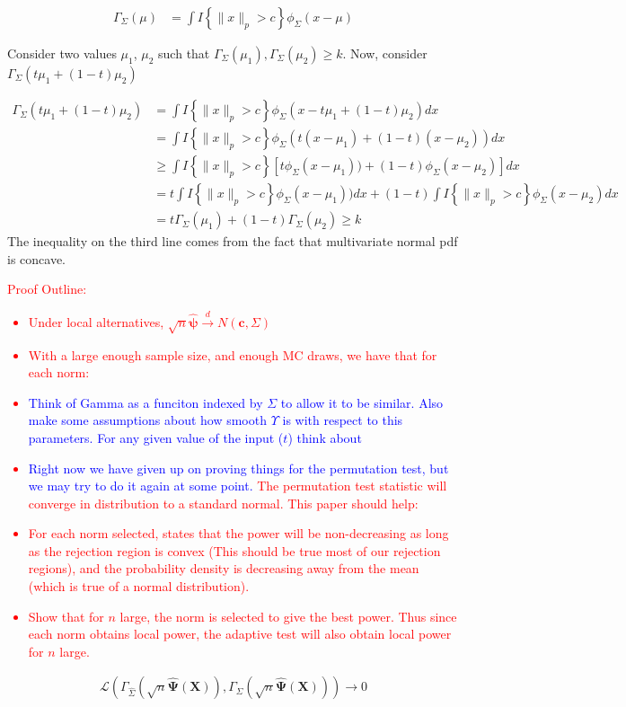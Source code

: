 \documentclass{article}
\newcommand{\sh}{\textcolor{red}}
\newcommand{\vmat}{\Sigma}
\newcommand{\Gammaf}{\Gamma_{\Sigma}}
\newcommand{\gi}{\Upsilon}
\begin{document}
\begin{align*}
	\Gammaf(\mu) & = \int I\left\{\|x\|_p > c\right\} \phi_{\Sigma}(x - \mu)
\end{align*}

Consider two values $\mu_1$, $\mu_2$ such that $ \Gammaf(\mu_1), \Gammaf(\mu_2) \geq k$.  Now, consider $\Gammaf\left(t\mu_1 + (1 - t)\mu_2\right)$

\begin{align*}
	\Gammaf\left(t\mu_1 + (1 - t)\mu_2\right) & = \int I\left\{\|x\|_p > c\right\} \phi_{\Sigma}(x - t\mu_1 + (1 - t)\mu_2)dx \\
	& =  \int I\left\{\|x\|_p > c\right\} \phi_{\Sigma}(t(x - \mu_1) + (1 - t)(x - \mu_2))dx\\
	& \geq  \int I\left\{\|x\|_p > c\right\} \left[t\phi_{\Sigma}(x - \mu_1)) + (1 - t)\phi_{\Sigma}(x - \mu_2)\right]dx \\
	& = t \int I\left\{\|x\|_p > c\right\} \phi_{\Sigma}(x - \mu_1))dx + (1 - t) \int I\left\{\|x\|_p > c\right\} \phi_{\Sigma}(x - \mu_2)dx \\
	& = t \Gammaf(\mu_1) + (1 - t) \Gammaf(\mu_2) \geq k	
\end{align*}
The inequality on the third line comes from the fact that multivariate normal pdf is concave.

\sh{Proof Outline: \\
\begin{itemize}
	\item Under local alternatives, $\sqrt{n}\hat{\boldsymbol{\psi}} \xrightarrow{d} N(\boldsymbol{c}, \Sigma)$
	\item With a large enough sample size, and enough MC draws, we have that for each norm: 
    \item \textcolor{blue}{Think of Gamma as a funciton indexed by $\Sigma$ to allow it to be similar.  Also make some assumptions about how smooth $\gi$ is with respect to this parameters. For any given value of the input ($t$) think about }
	\item \textcolor{blue}{Right now we have given up on proving things for the permutation test, but we may try to do it again at some point.} The permutation test statistic will converge in distribution to a standard normal.  This paper should help: \citep{omelka_testing_2012}
	\item For each norm selected, \citep{gupta_inequalitites_1972} states that the power will be non-decreasing as long as the rejection region is convex (This should be true most of our rejection regions), and the probability density is decreasing away from the mean (which is true of a normal distribution).  
	\item Show that for $n$ large, the norm is selected to give the best power.  Thus since each norm obtains local power, the adaptive test will also obtain local power for $n$ large.
\end{itemize}} 
\begin{align*}
	\mathcal{L}\left(\Gamma_{\hat{\vmat}}\left(\sqrt{n} \hat{\boldsymbol{\Psi}}(\boldsymbol{X})\right), \Gamma_{\vmat}\left(\sqrt{n} \hat{\boldsymbol{\Psi}}(\boldsymbol{X})\right)\right) \rightarrow 0
\end{align*}
\end{document}
